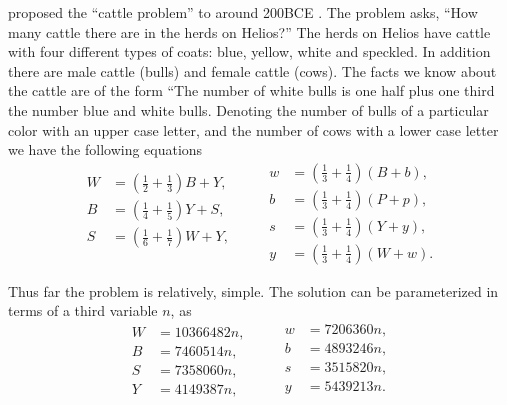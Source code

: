 proposed the ``cattle
problem'' to 
around 200BCE \cite[pp. 202--205]{Thomas51}.  The problem asks, ``How
many cattle there are in the herds on Helios?''  The herds on Helios
have cattle with four different types of coats: blue, yellow,
white and speckled.  In addition there are male cattle (bulls) and
female cattle (cows).  The facts we know about the cattle are of the
form ``The number of white bulls is one half plus one third the number
blue and white bulls.  Denoting the number of bulls of a particular
color with an upper case letter, and the number of cows with a lower
case letter we have the following equations
\[
\begin{aligned}
  W &= \left(\frac{1}{2} + \frac{1}{3}\right) B + Y, \\
  B &= \left(\frac{1}{4} + \frac{1}{5}\right) Y + S, \\
  S &= \left(\frac{1}{6} + \frac{1}{7}\right) W + Y, \\
\end{aligned}
\qquad
\begin {aligned}
  w &= \left(\frac{1}{3} + \frac{1}{4}\right) (B + b), \\
  b &= \left(\frac{1}{3} + \frac{1}{4}\right) (P + p), \\
  s &= \left(\frac{1}{3} + \frac{1}{4}\right) (Y + y), \\
  y &= \left(\frac{1}{3} + \frac{1}{4}\right) (W + w). 
\end{aligned}
\]

Thus far the problem is relatively, simple.  The solution can be
parameterized in terms of a third variable $n$, as
\[
\begin{aligned}
  W &= 10366482 n, \\
  B &= 7460514n, \\
  S &= 7358060n, \\
  Y &= 4149387n,
\end{aligned}
\qquad
\begin {aligned}
  w &= 7206360n, \\
  b &= 4893246n, \\
  s &= 3515820n, \\
  y &= 5439213n. \\
\end{aligned}
\]

